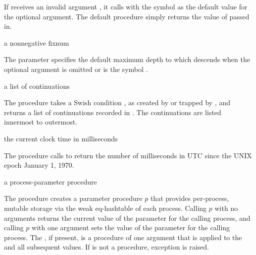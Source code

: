 If  receives an invalid argument , it calls
 with
the symbol  as the default value for the
optional  argument.
The default  procedure simply returns the value of
 passed in.

\begin{parameter}
\end{parameter}
\returns{} a nonnegative fixnum

The  parameter specifies the default maximum
depth to which  descends when the optional 
argument is omitted or is the symbol .

\begin{procedure}
\end{procedure}
\returns{} a list of continuations

The  procedure takes a Swish condition ,
as created by  or trapped by ,
and returns a list of continuations recorded in .
The continuations are listed innermost to outermost.

\begin{procedure}
\end{procedure}
\returns{} the current clock time in milliseconds

The  procedure calls  to return
the number of milliseconds in UTC since the UNIX epoch January 1,
1970.

\begin{procedure}
\end{procedure}
\returns{} a process-parameter procedure

The  procedure creates a parameter
procedure $p$ that provides per-process, mutable storage via the
 weak eq-hashtable of each process. Calling $p$ with
no arguments returns the current value of the parameter for the
calling process, and calling $p$ with one argument sets the value of
the parameter for the calling process. The , if present,
is a procedure of one argument that is applied to the 
and all subsequent values. If  is not a procedure,
exception  is
raised.

